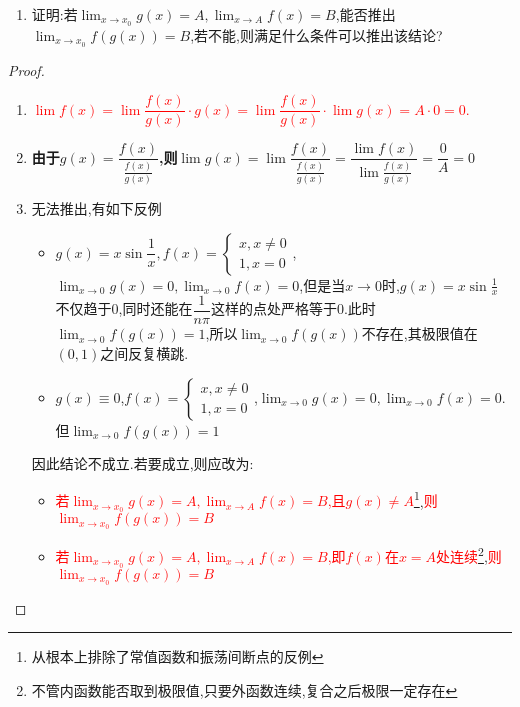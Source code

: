 \documentclass[8pt a4paper, oneside, UTF8]{ctexbook}
\begin{document}
\begin{sloppypar}
\begin{problem}
\begin{enumerate}
            \item 证明:若$\lim_{x \to x_0}g(x)=A,\lim_{x \to A}f(x)=B$,能否推出$\lim_{x\to x_0}f(g(x))=B$,若不能,则满足什么条件可以推出该结论?
        \end{enumerate}
    \end{problem}
    \begin{proof}
        \begin{enumerate}
            \item \textcolor{red}{$\lim f(x)=\lim\dfrac{f(x)}{g(x)}\cdot g(x)=\lim\dfrac{f(x)}{g(x)}\cdot\lim g(x)=A\cdot0=0.$}
            \item \textbf{由于$g(x)=\dfrac{f(x)}{\frac{f(x)}{g(x)}}$,则$\lim g(x)=\lim\dfrac{f(x)}{\frac{f(x)}{g(x)}}=\dfrac{\lim f(x)}{\lim\frac{f(x)}{g(x)}}=\dfrac{0}{A}=0$}
            \item 无法推出,有如下反例
            \begin{itemize}
                \item $g(x)=x \sin \dfrac{1}{x},f(x)=\begin{cases} x,x \neq 0\\1,x=0 \end{cases}$,$\lim_{x \to 0}g(x)=0,\lim_{x\to0}f(x)=0$,但是当$x \to 0$时,$g(x)=x\sin \frac{1}{x}$不仅趋于0,同时还能在$\dfrac{1}{n \pi}$这样的点处严格等于0.此时$\lim_{x \to 0}f(g(x))=1$,所以$\lim_{x\to 0}f(g(x))$不存在,其极限值在$(0,1)$之间反复横跳.
                \item $g(x) \equiv 0$,$f(x)=\begin{cases} x,x \neq 0\\ 1,x=0 \end{cases}$,$\lim_{x\to 0}g(x)=0,\lim_{x\to 0}f(x)=0.$但$\lim_{x\to 0}f(g(x))=1$
            \end{itemize}
            因此结论不成立.若要成立,则应改为:
            \begin{itemize}
                \item \textcolor{red}{若$\lim_{x \to x_0}g(x)=A,\lim_{x\to A}f(x)=B$,且$g(x)\neq A$}\footnote{从根本上排除了常值函数和振荡间断点的反例},\textcolor{red}{则$\lim_{x\to x_0}f(g(x))=B$}
                \item \textcolor{red}{若$\lim_{x \to x_0}g(x)=A,\lim_{x\to A}f(x)=B$,即$f(x)$在$x=A$处连续}\footnote{不管内函数能否取到极限值,只要外函数连续,复合之后极限一定存在},\textcolor{red}{则$\lim_{x\to x_0}f(g(x))=B$}
            \end{itemize}
        \end{enumerate}
    \end{proof}

\end{sloppypar}
\end{document}
